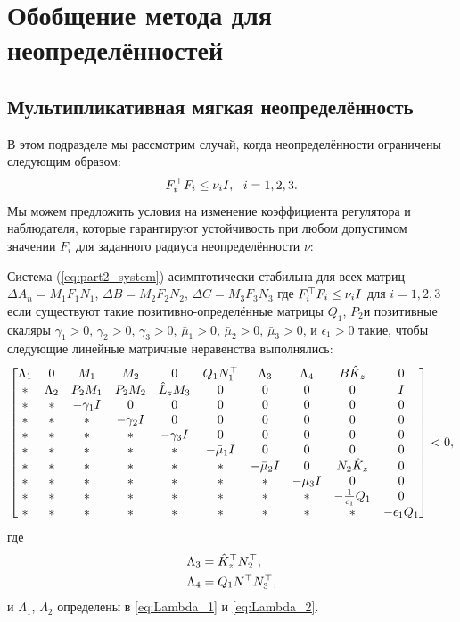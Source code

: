 \chapter{Обобщение метода для неопределённостей}\label{ch:ch4}
\section{Мультипликативная мягкая неопределённость}\label{sec:ch4/sect1}

В этом подразделе мы рассмотрим случай, когда неопределённости ограничены следующим образом:
%
\begin{equation}
	\label{eq:part2_nu_uncertainty}
	{F}_i^\top{F}_i\leq \nu_i {I}, \ \ i=1,2,3.
\end{equation}
%
Мы можем предложить условия на изменение коэффициента регулятора и наблюдателя, которые гарантируют устойчивость при любом допустимом значении ${F}_i$ для заданного радиуса неопределённости $\nu$:
\begin{theorem}\label{thm:part2_LMI_2}
	Система (\ref{eq:part2_system}) асимптотически стабильна для всех матриц
	$\Delta {A}_n={M}_1{F}_1{N}_1$, 
	$\Delta {B}= {M}_2{F}_2{N}_2$, 
	$\Delta {C} = {M}_3{F}_3{N}_3$
	где
	${F}_i^\top{F}_i\leq \nu_i {I}$ для $i=1,2,3$
	если существуют такие позитивно-определённые матрицы ${Q}_1$, ${P}_2$и позитивные скаляры
	$\gamma_1>0$, $\gamma_2>0$, $\gamma_3>0$, $\bar{\mu}_1>0$, $\bar{\mu}_2>0$, $\bar{\mu}_3>0$, и $\epsilon_1 > 0$ такие, чтобы следующие линейные матричные неравенства выполнялись:
	\begin{equation}
		\label{eq:thm4_final_LMI}
		\begin{bmatrix}
			{\Lambda}_1 & 0 & {M}_1 & {M}_2&0 & {Q}_1{N}_1^\top & {\Lambda}_3 &{\Lambda}_4 & {B}\hat{{K}}_z & 0\\
			* & {\Lambda}_2 & {P}_2{M}_1 & {P}_2{M}_2 & \hat{{L}}_z{M}_3& 0& 0&0&0&{I} \\
			* & * & -\gamma_1{I} & 0&0&0&0&0&0&0\\
			* & * &*  & -\gamma_2{I}&0&0&0&0&0&0\\
			*& * & * &*  & -\gamma_3{I}&0&0&0&0&0\\
			* &* & * & * & *&-\bar{\mu}_1{I}&0&0&0&0\\
			* & * & * &*& *&*&-\bar{\mu}_2{I}& 0&{N}_2\hat{{K}}_z&0\\
			*&*&* &* & * & * & *&-\bar{\mu}_3{I}&0&0\\
			* & * & *&*&* & *&*&*&-\frac{1}{\epsilon_1}{Q}_1&0\\
			* & * & * & *&*&*&*&*&*&-\epsilon_1{Q}_1\\
		\end{bmatrix}<0,
	\end{equation}
	где
	\begin{align}
		{\Lambda}_3&=\hat{{K}}_z^\top{N}_2^\top,\\ {\Lambda}_4&={Q}_1{N}^\top{N}_3^\top,
	\end{align}
	и ${\Lambda}_1$, ${\Lambda}_2$ определены в \eqref{eq:Lambda_1} и \eqref{eq:Lambda_2}. 
\end{theorem}
